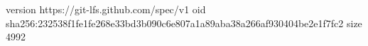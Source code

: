 version https://git-lfs.github.com/spec/v1
oid sha256:232538f1fe1fe268e33bd3b090c6e807a1a89aba38a266af930404be2e1f7fc2
size 4992
